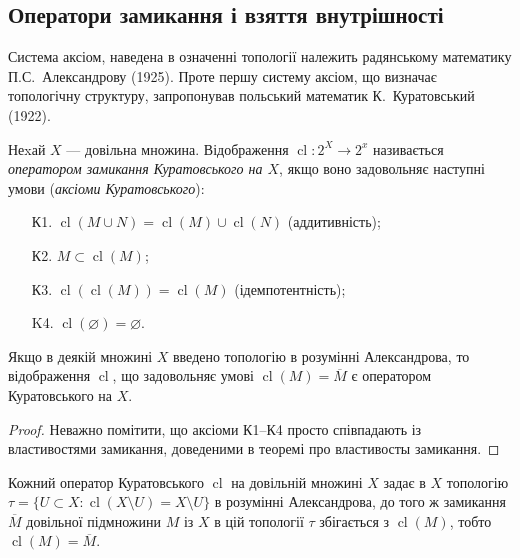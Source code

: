 \documentclass[a4paper, 12pt]{article}
\renewcommand{\emptyset}{\varnothing}
\DeclareMathOperator{\cl}{cl}
\begin{document}
\setcounter{section}{2}

\subsection{Оператори замикання і взяття внутрішності}

Система аксіом, наведена в означенні топології належить
радянському математику П.С.~Александрову (1925). Проте
першу систему аксіом, що визначає топологічну структуру, 
запропонував польський математик К.~Куратовський (1922).

\begin{definition}
	Неxай $X$ --- довільна множина. Відображення
	$\cl: 2^X \to 2^x$ називається \textit{оператором замикання
	Куратовського на $X$}, якщо воно задовольняє наступні
	умови (\textit{аксіоми Куратовського}):
	\begin{enumerate}
		\item[К1.] $\cl(M \cup N) = \cl(M) \cup \cl(N)$ (аддитивність);
		\item[К2.] $M \subset \cl(M)$;
		\item[К3.] $\cl(\cl(M)) = \cl(M)$ (ідемпотентність);
		\item[K4.] $\cl(\emptyset) = \emptyset$.
	\end{enumerate}
\end{definition}

\begin{theorem}
	Якщо в деякій множині $X$ введено топологію в
	розумінні Александрова, то відображення $\cl$, що
	задовольняє умові $\cl (M) = \overline{M}$ є оператором Куратовського
	на $X$.
\end{theorem}

\begin{proof}
	Неважно помітити, що аксіоми К1--К4 просто
	співпадають із властивостями замикання, доведеними в
	теоремі про властивосты замикання.
\end{proof}

\begin{theorem}
	Кожний оператор Куратовського $\cl$ на
	довільній множині $X$ задає в $X$ топологію
	$\tau = \{ U \subset X: \cl(X \setminus U) = X \setminus U\}$ в розумінні Александрова, до
	того ж замикання $\overline{M}$ довільної підмножини $M$ із $X$ в цій
	топології $\tau$ збігається з $\cl(M)$, тобто $\cl (M) = \overline{M}$.
\end{theorem}
\end{document}
